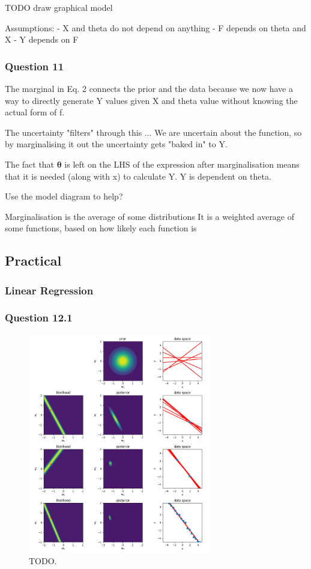 \documentclass[10pt, a4paper, twocolumn]{article} %
\begin{document}
TODO draw graphical model

Assumptions:
- X and theta do not depend on anything
- F depends on theta and X
- Y depends on F

\subsubsection*{Question 11}

The marginal in Eq. 2 connects the prior and the data because we now have a way to directly generate Y values given X and theta value without knowing the actual form of f.

The uncertainty "filters" through this ...
We are uncertain about the function, so by marginalising it out the uncertainty gets "baked in" to Y.

The fact that $\mathbf{\theta}$ is left on the LHS of the expression after marginalisation means that it is needed (along with x) to calculate Y. Y is dependent on theta.

Use the model diagram to help?

Marginalisation is the average of some distributions
It is a weighted average of some functions, based on how likely each function is

\subsection{Practical}

\subsubsection{Linear Regression}

\subsubsection*{Question 12.1}

\begin{figure}[htbp]
\centerline{\includegraphics[width=8cm]{q12.png}}
\caption{TODO.}
\label{fig2}
\end{figure}
\end{document}
